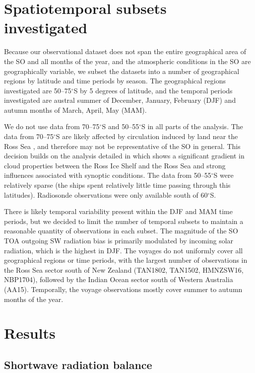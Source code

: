 \section{Spatiotemporal subsets investigated}
\label{sec:domains}

Because our observational dataset does not span the entire geographical area of
the SO and all months of the year, and the atmospheric conditions in the SO are
geographically variable, we subset the datasets into a number of geographical
regions by latitude and time periods by season. The geographical regions
investigated are 50--75$^\circ$S by 5 degrees of latitude, and the temporal
periods investigated are austral summer of December, January, February (DJF)
and autumn months of March, April, May (MAM).

We do not use data from 70--75$^\circ$S and 50--55$^\circ$S in all parts of
the analysis.  The data from 70--75$^\circ$S are likely affected by
circulation induced by land near the Ross Sea \citep{coggins2014}, and
therefore may not be representative of the SO in general. This decision builds
on the analysis detailed in \cite{jolly2018} which shows a significant gradient
in cloud properties between the Ross Ice Shelf and the Ross Sea and strong
influences associated with synoptic conditions. The data from 50--55$^\circ$S
were relatively sparse (the ships spent relatively little time passing through
this latitudes). Radiosonde observations were only available south of
60$^\circ$S.

There is likely temporal variability present within the DJF and MAM
time periods, but we decided to limit the number of temporal subsets
to maintain a reasonable quantity of observations in each subset.
The magnitude of the SO TOA outgoing SW radiation bias is primarily modulated
by incoming solar radiation, which is the highest in DJF.
The voyages do not uniformly cover all geographical regions or time periods,
with the largest number of observations in the Ross Sea sector south of New
Zealand (TAN1802, TAN1502, HMNZSW16, NBP1704), followed by the Indian Ocean
sector south of Western Australia (AA15). Temporally, the voyage observations
mostly cover summer to autumn months of the year.

\section{Results}

\subsection{Shortwave radiation balance}
\label{sec:sw-radiation-balance}

